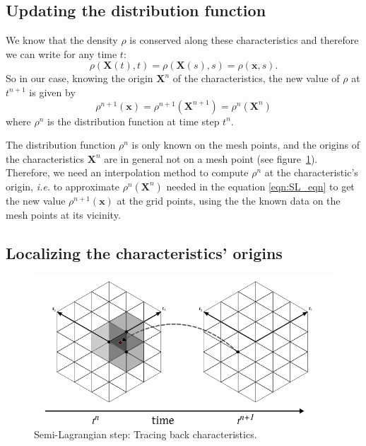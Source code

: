 \documentclass[proc]{edpsmath}
\begin{document}
\subsection{Updating the distribution function}

We know that the density $\rho$ is conserved along these characteristics and therefore we can write for any time $t$:
\begin{equation}
	\rho(\mathbf{X}(t), t) = \rho(\mathbf{X}(s), s)= \rho(\mathbf{x}, s).
\end{equation}
So in our case, knowing the origin $ \mathbf{X}^n$ of the characteristics, the new value of $\rho$ at $t^{n+1}$ is given by
\begin{equation}
\label{eqn:SL_eqn}
	\rho^{n+1} (\mathbf{x}) =\rho^{n+1}(\mathbf{X}^{n+1})= \rho^n(\mathbf{X}^{n})
\end{equation}
where $\rho^n$ is the distribution function at  time step $t^n$.

The distribution function $\rho^n$ is only known on the mesh points, and the origins of the characteristics $ \mathbf{X}^{n}$ are in general not on a mesh point (see figure~\ref{fig:SL_hex}). Therefore, we need an interpolation method to compute $\rho^n$ at the characteristic's origin, \emph{i.e.} to approximate $\rho^n(\mathbf{X}^{n})$ needed in the equation \eqref{eqn:SL_eqn} to get the new value  $\rho^{n+1}( \mathbf{x} )$ at the grid points, using the the known data on the mesh points at its vicinity.


\subsection{Localizing the characteristics' origins}


\begin{figure}[h!]
	\centering
	\includegraphics[scale=0.5]{figures/SL_hex.png} 
	\caption{Semi-Lagrangian step: Tracing back characteristics.}
	\label{fig:SL_hex}
\end{figure}
\end{document}
